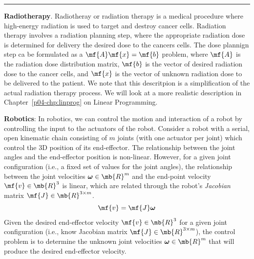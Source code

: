 \begin{boxedstuff}
    \vspace{4mm}
    \hrule
    \begin{example}
        \textbf{Radiotherapy}. Radiotheray or radiation therapy is a medical procedure where high-energy radiation is used to target and destroy cancer cells. Radiation therapy involves a radiation planning step, where the appropriate radiation dose is determined for delivery the desired dose to the cancers cells. The dose plannign step ca be formulated as a $\mf{A}\mf{x} = \mf{b}$ problem, where $\mf{A}$ is the radiation dose distribution matrix, $\mf{b}$ is the vector of desired radiation dose to the cancer cells, and $\mf{x}$ is the vector of unknown radiation dose to be delivered to the patient. We note that this descritpion is a simplification of the actual radiation therapy process. We will look at a more realistic description in Chapter~\ref{p04-chp:linprog} on Linear Programming.
    \end{example}
    \begin{example}
        \textbf{Robotics}: In robotics, we can control the motion and interaction of a robot by controlling the input to the actuators of the robot. Consider a robot with a serial, open kinematic chain consisting of $m$ joints (with one actuator per joint) which control the 3D position of its end-effector. The relationship between the joint angles and the end-effector position is non-linear. However, for a given joint configuration (i.e., a fixed set of values for the joint angles), the relationship between the joint velocities $\bm{\omega} \in \mb{R}^m$ and the end-point velocity $\mf{v} \in \mb{R}^3$ is linear, which are related through the robot's \textit{Jacobian} matrix $\mf{J} \in \mb{R}^{3 \times m}$.
        \[  \mf{v} = \mf{J} \bm{\omega} \]
        Given the desired end-effector velocity $\mf{v}\in \mb{R}^3$ for a given joint configuration (i.e., know Jacobian matrix $\mf{J} \in \mb{R}^{3 \times m}$), the control problem is to determine the unknown joint velocities $\bm{\omega} \in \mb{R}^m$ that will produce the desired end-effector velocity.
    \end{example}
\end{boxedstuff}

